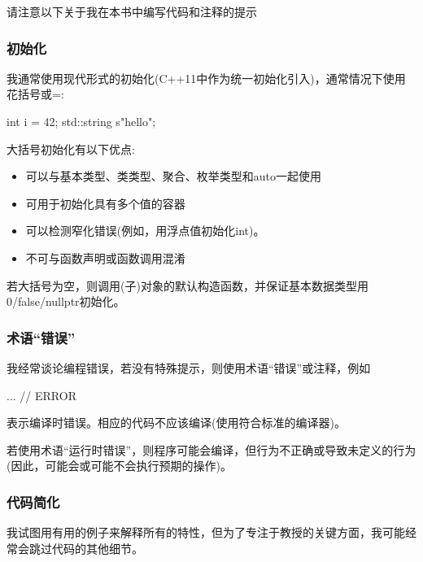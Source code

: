 
请注意以下关于我在本书中编写代码和注释的提示

\subsubsection*{ 初始化}

我通常使用现代形式的初始化(C++11中作为统一初始化引入)，通常情况下使用花括号或=:

\begin{cpp}
int i = 42;
std::string s{"hello"};
\end{cpp}

大括号初始化有以下优点:

\begin{itemize}
\item
可以与基本类型、类类型、聚合、枚举类型和auto一起使用

\item
可用于初始化具有多个值的容器

\item
可以检测窄化错误(例如，用浮点值初始化int)。

\item
不可与函数声明或函数调用混淆
\end{itemize}

若大括号为空，则调用(子)对象的默认构造函数，并保证基本数据类型用0/false/nullptr初始化。


\subsubsection*{ 术语“错误”}

我经常谈论编程错误，若没有特殊提示，则使用术语“错误”或注释，例如

\begin{cpp}
... // ERROR
\end{cpp}

表示编译时错误。相应的代码不应该编译(使用符合标准的编译器)。

若使用术语“运行时错误”，则程序可能会编译，但行为不正确或导致未定义的行为(因此，可能会或可能不会执行预期的操作)。

\subsubsection*{ 代码简化}

我试图用有用的例子来解释所有的特性，但为了专注于教授的关键方面，我可能经常会跳过代码的其他细节。


